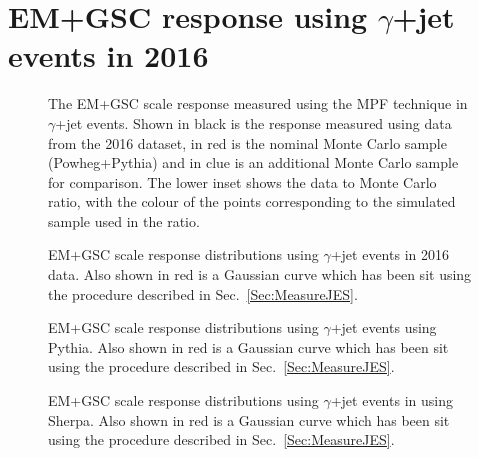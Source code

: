 \chapter{EM+GSC response using $\gamma$+jet events in 2016}
\label{App:GJetEM2016}

\begin{figure}[!ht]
  \begin{center}
  \end{center}
  \caption[EM scale response using $\gamma$+jet in 2016]
  {\small The EM+GSC scale response measured using the MPF technique in $\gamma$+jet events.  Shown in black is the response measured using data from the 2016 dataset, in red is the nominal Monte Carlo sample (Powheg+Pythia) and in clue is an additional Monte Carlo sample for comparison.  The lower inset shows the data to Monte Carlo ratio, with the colour of the points corresponding to the simulated sample used in the ratio.  }
  \label{plot:GJetEM2016App}
\end{figure}


\begin{figure}[!ht]
  \begin{center}
  \end{center}
  \caption[EM scale response distributions in data using $\gamma$+jet in 2016]
  {\small EM+GSC scale response distributions using $\gamma$+jet events in 2016 data.  Also shown in red is a Gaussian curve which has been sit using the procedure described in Sec.~\ref{Sec:MeasureJES}. }
  \label{plot:GJetEM2016DataDistsApp}
\end{figure}

\begin{figure}[!ht]
  \begin{center}
  \end{center}
  \caption[EM scale response distributions in Pythia using $\gamma$+jet in 2016]
  {\small EM+GSC scale response distributions using $\gamma$+jet events using Pythia.  Also shown in red is a Gaussian curve which has been sit using the procedure described in Sec.~\ref{Sec:MeasureJES}. }
  \label{plot:GJetEM2016PythiaistsApp}
\end{figure}

\begin{figure}[!ht]
  \begin{center}
  \end{center}
  \caption[EM scale response distributions in Sherpa using $\gamma$+jet in 2016]
  {\small EM+GSC scale response distributions using $\gamma$+jet events in using Sherpa.  Also shown in red is a Gaussian curve which has been sit using the procedure described in Sec.~\ref{Sec:MeasureJES}. }
  \label{plot:GJetEM2016SherpaDistsApp}
\end{figure}

